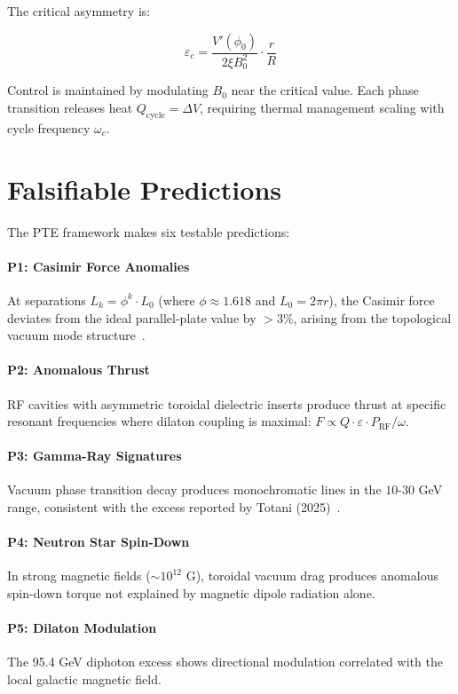 \documentclass[12pt,a4paper]{article}
\begin{document}
The critical asymmetry is:

\begin{equation}
\varepsilon_c = \frac{V'(\phi_0)}{2\xi B_0^2} \cdot \frac{r}{R}
\label{eq:critical}
\end{equation}

Control is maintained by modulating $B_0$ near the critical value. Each phase transition releases heat $Q_{\text{cycle}} = \Delta V$, requiring thermal management scaling with cycle frequency $\omega_c$.

\section{Falsifiable Predictions}

The PTE framework makes six testable predictions:

\paragraph{P1: Casimir Force Anomalies} At separations $L_k = \phi^k \cdot L_0$ (where $\phi \approx 1.618$ and $L_0 = 2\pi r$), the Casimir force deviates from the ideal parallel-plate value by $>3\%$, arising from the topological vacuum mode structure~\cite{zero2025}.

\paragraph{P2: Anomalous Thrust} RF cavities with asymmetric toroidal dielectric inserts produce thrust at specific resonant frequencies where dilaton coupling is maximal: $F \propto Q \cdot \varepsilon \cdot P_{\text{RF}} / \omega$.

\paragraph{P3: Gamma-Ray Signatures} Vacuum phase transition decay produces monochromatic lines in the $10$-$30$ GeV range, consistent with the excess reported by Totani (2025)~\cite{totani2025}.

\paragraph{P4: Neutron Star Spin-Down} In strong magnetic fields ($\sim 10^{12}$ G), toroidal vacuum drag produces anomalous spin-down torque not explained by magnetic dipole radiation alone.

\paragraph{P5: Dilaton Modulation} The 95.4 GeV diphoton excess shows directional modulation correlated with the local galactic magnetic field.
\end{document}
